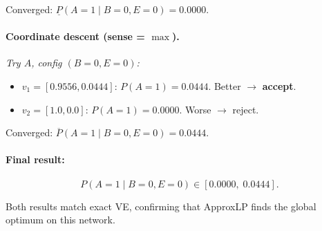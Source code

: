 \documentclass{article}
\begin{document}
Converged: $\underline{P}(A{=}1 \mid B{=}0, E{=}0) = 0.0000$.

\paragraph{Coordinate descent (sense = $\max$).}

\emph{Try $A$, config $(B{=}0, E{=}0)$:}
\begin{itemize}
  \item $v_1 = [0.9556, 0.0444]$: $P(A{=}1) = 0.0444$. Better $\to$ \textbf{accept}.
  \item $v_2 = [1.0, 0.0]$: $P(A{=}1) = 0.0000$. Worse $\to$ reject.
\end{itemize}

Converged: $\overline{P}(A{=}1 \mid B{=}0, E{=}0) = 0.0444$.

\paragraph{Final result:}
\[
  \boxed{P(A{=}1 \mid B{=}0, E{=}0) \in [0.0000,\; 0.0444].}
\]

Both results match exact VE, confirming that ApproxLP finds the global optimum on this network.




\end{document}

